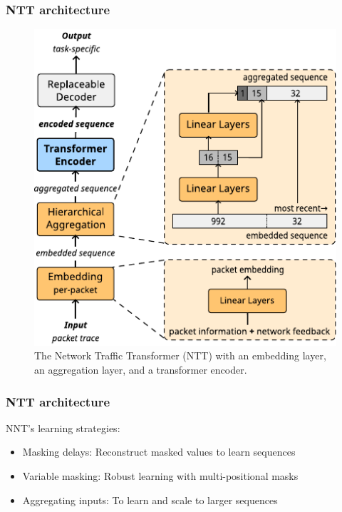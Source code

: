 \documentclass{beamer}
\begin{document}
\begin{frame}
\frametitle{NTT architecture}

\begin{figure}[!hbt]
  \begin{center}
    \includegraphics[scale=0.8]{figures/architecture_ntt.pdf}
    \caption{The Network Traffic Transformer (NTT) with
        an embedding layer, %
        an aggregation layer, and
        a transformer encoder.}
    \label{fig:ntt}
  \end{center}
\end{figure}
\end{frame}

\begin{frame}
\frametitle{NTT architecture}

NNT's learning strategies: 
\pause 
\begin{itemize}
    \item<1-> \alert{Masking delays:} Reconstruct masked values to learn sequences 
    \item<1-> \alert{Variable masking:} Robust learning with multi-positional masks
    \item<1-> \alert{Aggregating inputs:} To learn and scale to larger sequences
\end{itemize}
\end{frame}
\end{document}
